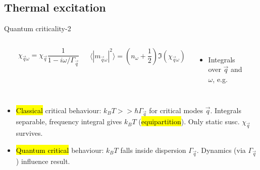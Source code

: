 \subsection{Thermal excitation}
\begin{frame}[label=quancrit2]{Quantum criticality-2}

\begin{columns}[t]
  \centerline{~}
  \[ \chi_{\vec q \omega} = \chi_{\vec q} \frac{1}{1-i\omega/\Gamma_\vec q} \]

  \[ \langle |m_{\vec q\omega}|^2 \rangle = \left(n_\omega + \frac{1}{2}\right) \Im(\chi_{\vec q \omega}) \]

\begin{itemize}
\item<2->
  Integrals over $\vec q$ and $\omega$, e.g.
\end{itemize}

  \centerline{~}

\end{columns}

\begin{itemize}
\item<3->
  \hl{Classical} critical behaviour: $k_B T >> \hbar \Gamma_\vec q$ for
  critical modes $\vec q$.  Integrals separable, frequency integral
  gives $k_B T$ (\hl{equipartition}). Only static susc.  $\chi_\vec q$
  survives.  

\item<4->
  \hl{Quantum critical} behaviour: $k_B T$ falls inside dispersion
  $\Gamma_\vec q$.  Dynamics (via $\Gamma_\vec q$) influence result.
\end{itemize}

\end{frame}


